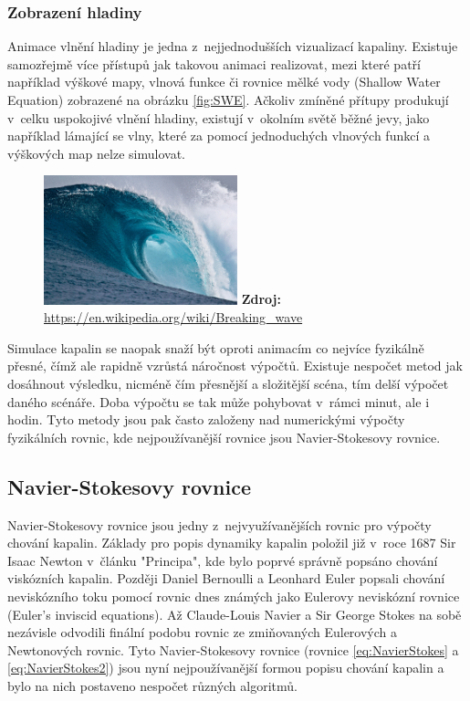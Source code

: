 \subsubsection{Zobrazení hladiny}
Animace vlnění hladiny je jedna z~nejjednodušších vizualizací kapaliny. Existuje samozřejmě více přístupů jak takovou animaci realizovat, mezi které patří například výškové mapy, vlnová funkce či rovnice mělké vody (Shallow Water Equation) zobrazené na obrázku \ref{fig:SWE}. Ačkoliv zmíněné přítupy produkují v~celku uspokojivé vlnění hladiny, existují v~okolním světě běžné jevy, jako například lámající se vlny, které za pomocí jednoduchých vlnových funkcí a výškových map nelze simulovat. \cite{Medvecky-Heretik2018thesis}

\begin{figure}[hbt]
	\centering
	\captionsetup{justification=centering}
	\includegraphics[width=0.5\textwidth]{obrazky-figures/Large_breaking_wave.jpg}
	\textbf{Zdroj: } \url{https://en.wikipedia.org/wiki/Breaking_wave}
	\label{keepCalm}
\end{figure}

Simulace kapalin se naopak snaží být oproti animacím co nejvíce fyzikálně přesné, čímž ale rapidně vzrůstá náročnost výpočtů. Existuje nespočet metod jak dosáhnout výsledku, nicméně čím přesnější a složitější scéna, tím delší výpočet daného scénáře. Doba výpočtu se tak může pohybovat v~rámci minut, ale i hodin. Tyto metody jsou pak často založeny nad numerickými výpočty fyzikálních rovnic, kde nejpoužívanější rovnice jsou Navier-Stokesovy rovnice.

\subsection{Navier-Stokesovy rovnice}
Navier-Stokesovy rovnice jsou jedny z~nejvyužívanějších rovnic pro výpočty chování kapalin. Základy pro popis dynamiky kapalin položil již v~roce 1687 Sir Isaac Newton v~článku "Principa", kde bylo poprvé správně popsáno chování viskózních kapalin. Později Daniel Bernoulli a Leonhard Euler popsali chování neviskózního toku pomocí rovnic dnes známých jako Eulerovy neviskózní rovnice (Euler’s inviscid equations). Až Claude-Louis Navier a Sir George Stokes na sobě nezávisle odvodili finální podobu rovnic ze zmiňovaných Eulerových a Newtonových rovnic. Tyto Navier-Stokesovy rovnice (rovnice \ref{eq:NavierStokes} a \ref{eq:NavierStokes2})  jsou nyní nejpoužívanější formou popisu chování kapalin a bylo na nich postaveno nespočet různých algoritmů. \cite{simscale_2020}

